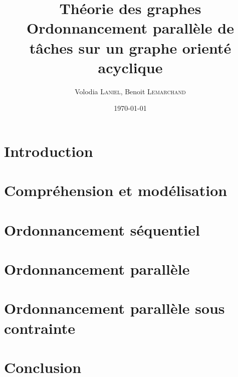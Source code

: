\documentclass[11pt]{article}
\title{Théorie des graphes\\
Ordonnancement parallèle de tâches sur un graphe orienté acyclique}
\author{Volodia \textsc{Laniel}, Benoit \textsc{Lemarchand}}
\date{\today}
\begin{document}
\begin{titlepage}
  \maketitle
  \vfill
  \tableofcontents
\end{titlepage}

\section*{Introduction}
\section{Compréhension et modélisation}
\section{Ordonnancement séquentiel}
\section{Ordonnancement parallèle}
\section{Ordonnancement parallèle sous contrainte}
\section*{Conclusion}
\end{document}

